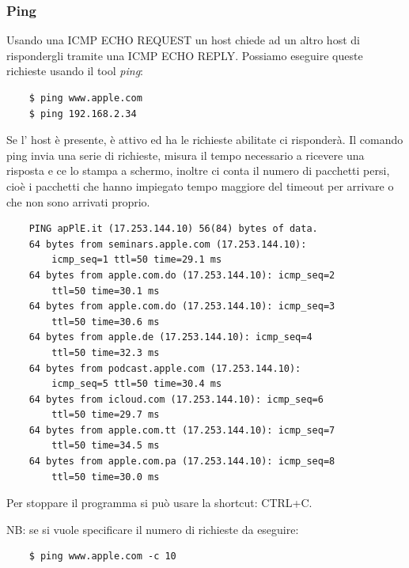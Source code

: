 \subsubsection{Ping}
Usando una ICMP ECHO REQUEST un host chiede ad un altro host di rispondergli tramite una ICMP ECHO REPLY.
Possiamo eseguire queste richieste usando il tool \emph{ping}:
\begin{verbatim}
    $ ping www.apple.com
    $ ping 192.168.2.34
\end{verbatim}
Se l' host è presente, è attivo ed ha le richieste abilitate ci risponderà.
Il comando ping invia una serie di richieste, misura il tempo necessario a ricevere una risposta e ce lo stampa a schermo, inoltre ci conta il numero di pacchetti persi, cioè i pacchetti che hanno impiegato tempo maggiore del timeout per arrivare o che non sono arrivati proprio.
\begin{verbatim}
    PING apPlE.it (17.253.144.10) 56(84) bytes of data.
    64 bytes from seminars.apple.com (17.253.144.10): 
        icmp_seq=1 ttl=50 time=29.1 ms
    64 bytes from apple.com.do (17.253.144.10): icmp_seq=2
        ttl=50 time=30.1 ms
    64 bytes from apple.com.do (17.253.144.10): icmp_seq=3
        ttl=50 time=30.6 ms
    64 bytes from apple.de (17.253.144.10): icmp_seq=4
        ttl=50 time=32.3 ms
    64 bytes from podcast.apple.com (17.253.144.10):
        icmp_seq=5 ttl=50 time=30.4 ms
    64 bytes from icloud.com (17.253.144.10): icmp_seq=6
        ttl=50 time=29.7 ms
    64 bytes from apple.com.tt (17.253.144.10): icmp_seq=7
        ttl=50 time=34.5 ms
    64 bytes from apple.com.pa (17.253.144.10): icmp_seq=8
        ttl=50 time=30.0 ms
\end{verbatim}
Per stoppare il programma si può usare la shortcut: CTRL+C.

NB: se si vuole specificare il numero di richieste da eseguire:
\begin{verbatim}
    $ ping www.apple.com -c 10
\end{verbatim}

